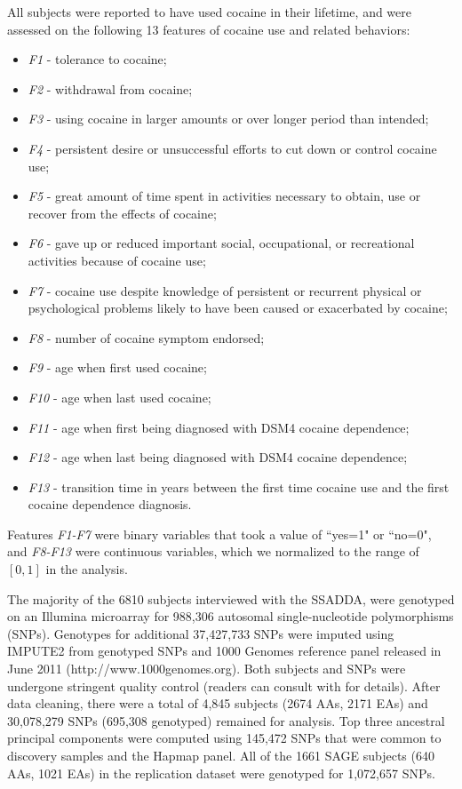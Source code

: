 \documentclass[10pt,letterpaper]{article}
\begin{document}
All subjects were reported to have used cocaine in their lifetime, and were assessed on the following 13 features of cocaine use and related behaviors:
\begin{itemize} \itemsep 1pt \parskip 0pt
	\item {\em F1} - tolerance to cocaine; 
	\item {\em F2} - withdrawal from cocaine; 
	\item {\em F3} - using cocaine in larger amounts or over longer period than intended; 
	\item {\em F4} - persistent desire or unsuccessful efforts to cut down or control cocaine use; 
	\item {\em F5} - great amount of time spent in activities necessary to obtain, use or recover from the effects of cocaine; 
	\item {\em F6} - gave up or reduced important social, occupational, or recreational activities because of cocaine use; 
	\item {\em F7} - cocaine use despite knowledge of persistent or recurrent physical or psychological problems likely to have been caused or exacerbated by cocaine; 
	\item {\em F8} - number of cocaine symptom endorsed;
	\item {\em F9} - age when first used cocaine;
	\item {\em F10} - age when last used cocaine;
	\item {\em F11} - age when first being diagnosed with DSM4 cocaine dependence;
	\item {\em F12} - age when last being diagnosed with DSM4 cocaine dependence;
	\item {\em F13} - transition time in years between the first time cocaine use and the first cocaine dependence diagnosis. 
\end{itemize}
Features {\em F1-F7} were binary variables that took a value of ``yes=1" or ``no=0", and {\em F8-F13} were continuous variables, which we normalized to the range of $[0,1]$ in the analysis. 

The majority of the 6810 subjects interviewed with the SSADDA, were genotyped on an Illumina microarray for 988,306 autosomal single-nucleotide polymorphisms (SNPs). Genotypes for additional 37,427,733 SNPs were imputed using IMPUTE2 \cite{impute2:2009} from genotyped SNPs and 1000 Genomes reference panel released in June 2011 (http://www.1000genomes.org). Both subjects and SNPs were undergone stringent quality control (readers can consult with \cite{Gelernter:CD:2014} for details). After data cleaning, there were a total of 4,845 subjects (2674 AAs, 2171 EAs) and 30,078,279 SNPs (695,308 genotyped) remained for analysis. Top three ancestral principal components were computed using 145,472 SNPs that were common to discovery samples and the Hapmap panel. All of the 1661 SAGE subjects (640 AAs, 1021 EAs) in the replication dataset were genotyped for 1,072,657 SNPs. 
\end{document}
